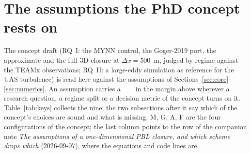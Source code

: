 \documentclass[10pt,a4paper]{article}
\newcommand{\keytag}[1]{\colorbox{keyc}{\textcolor{white}{\sffamily\bfseries\scriptsize K#1}}}
\begin{document}
\section{The assumptions the PhD concept rests on}
\label{sec:concept}

The concept draft (RQ~I: the MYNN control, the Goger-2019 port, the approximate and the full 3D closure at $\Delta x = 500$~m, judged by regime against the TEAMx observations; RQ~II: a large-eddy simulation as reference for the UAS turbulence) is read here against the assumptions of Sections~\ref{sec:core}--\ref{sec:numerics}. An assumption carries a \keytag{n} in the margin above wherever a research question, a regime split or a decision metric of the concept turns on it. Table~\ref{tab:keys} collects the nine; the two subsections after it say which of the concept's choices are sound and what is missing. M, G, A, F are the four configurations of the concept; the last column points to the row of the companion note \emph{The assumptions of a one-dimensional PBL closure, and which scheme drops which} (2026-09-07), where the equations and code lines are.
\end{document}
